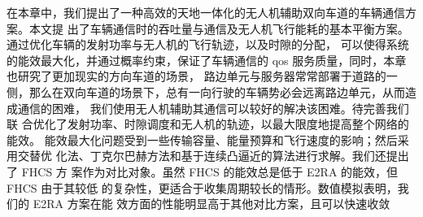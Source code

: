 在本章中，我们提出了一种高效的天地一体化的无人机辅助双向车道的车辆通信方案。本文提
出了车辆通信时的吞吐量与通信及无人机飞行能耗的基本平衡方案。通过优化车辆的发射功率与无人机的飞行轨迹，以及时隙的分配，
可以使得系统的能效最大化，并通过概率约束，保证了车辆通信的 qos 服务质量，同时，本章也研究了更加现实的方向车道的场景，
路边单元与服务器常常部署于道路的一侧，那么在双向车道的场景下，总有一向行驶的车辆势必会远离路边单元，从而造成通信的困难，
我们使用无人机辅助其通信可以较好的解决该困难。\textcolor[RGB]{18,220,168}{待完善我们联
合优化了发射功率、时隙调度和无人机的轨迹，以最大限度地提高整个网络的能效。
能效最大化问题受到一些传输容量、能量预算和飞行速度的影响；然后采用交替优
化法、丁克尔巴赫方法和基于连续凸逼近的算法进行求解。我们还提出了 FHCS 方
案作为对比对象。虽然 FHCS 的能效总是低于 E2RA 的能效，但 FHCS 由于其较低
的复杂性，更适合于收集周期较长的情形。数值模拟表明，我们的 E2RA 方案在能
效方面的性能明显高于其他对比方案，且可以快速收敛}

